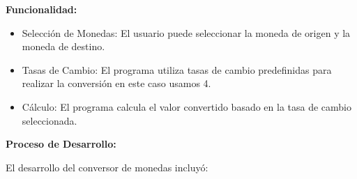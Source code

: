 \documentclass[a4paper]{article}
\newcommand\textstyleListLabelxviii[1]{\textrm{\textbf{#1}}}
\begin{document}
\bigskip


\bigskip


\bigskip


\bigskip


\bigskip


\bigskip


\bigskip


\bigskip


\bigskip


\bigskip


\bigskip


\bigskip


\bigskip


\bigskip


\bigskip


\bigskip


\bigskip


\bigskip


\bigskip


\bigskip


\bigskip


\bigskip


\bigskip


\bigskip


\bigskip


\bigskip


\bigskip


\bigskip


\bigskip


\bigskip


\bigskip


\bigskip


\bigskip

{
\textbf{Funcionalidad:}}

\begin{itemize}[series=listWWNumiv,label=\textstyleListLabelxviii{{}-}]
\item {
Selección de Monedas: El usuario puede seleccionar la moneda de origen y la moneda de destino.}
\item {
Tasas de Cambio: El programa utiliza tasas de cambio predefinidas para realizar la conversión en este caso usamos 4.}
\item {
Cálculo: El programa calcula el valor convertido basado en la tasa de cambio seleccionada.}
\end{itemize}
{
\textbf{Proceso de Desarrollo:}}

{
El desarrollo del conversor de monedas incluyó:}
\end{document}
